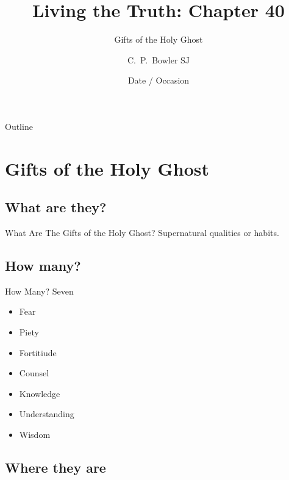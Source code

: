 \documentclass{beamer}
\title[Living the Truth 40] %
{Living the Truth: Chapter 40}
\subtitle
{Gifts of the Holy Ghost} %
\author[Author, Another] %
{C.~P.~Bowler SJ}
\institute[Universities of Somewhere and Elsewhere] %
{
  \inst{1}%
  Department of Computer Science\\
  University of Somewhere
  \and
  \inst{2}%
  Department of Theoretical Philosophy\\
  University of Elsewhere}
\date[Short Occasion] %
{Date / Occasion}
\begin{document}
\begin{frame}
  \titlepage
\end{frame}

\begin{frame}{Outline}
  \tableofcontents
\end{frame}




\section{Gifts of the Holy Ghost}

\subsection{What are they?}

\begin{frame}{What Are The Gifts of the Holy Ghost?}
Supernatural qualities or habits.
\end{frame}

\subsection{How many?}

\begin{frame}{How Many?}
Seven
\begin{itemize}
\item Fear
\item Piety
\item Fortitiude
\item Counsel
\item Knowledge
\item Understanding
\item Wisdom
\end{itemize}

\end{frame}

\subsection{Where they are}
\end{document}
